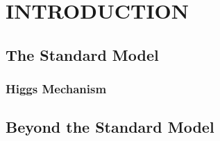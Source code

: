 %
%
%



\pagestyle{plain} %
\setcounter{page}{1}


\chapter{\uppercase {Introduction}}

\section{The Standard Model}
\subsection{Higgs Mechanism}

\section{Beyond the Standard Model}